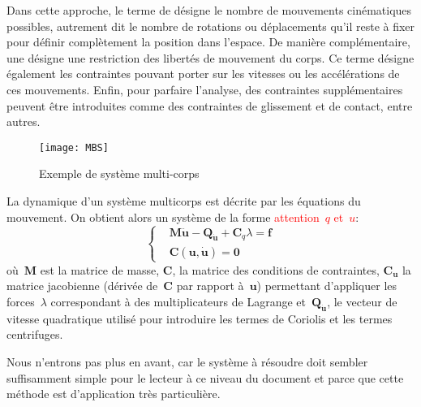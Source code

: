 \medskip
Dans cette approche, le terme de  désigne le nombre de mouvements cinématiques possibles, autrement dit le nombre de rotations ou déplacements qu'il reste à fixer pour définir complètement la position dans l'espace. De manière complémentaire, une  désigne une restriction des libertés de mouvement du corps. Ce terme désigne également les contraintes pouvant porter sur les vitesses ou les accélérations de ces mouvements. Enfin, pour parfaire l'analyse, des contraintes supplémentaires peuvent être introduites comme des contraintes de glissement et de contact, entre autres.
\begin{figure}[ht]
\centering
\texttt{[image: MBS]}
\caption{Exemple de système multi-corps}
\end{figure}
\medskipvm
La dynamique d'un système multicorps est décrite par les équations du mouvement. On obtient alors un système de la forme \textcolor{red}{attention~$q$ et~$u$}:
\begin{equation}%
\left\{%
\begin{aligned}%
&\mathbf{M}\ddot{\mathbf{u}}-\mathbf{Q}_{\dot{\mathbf{u}}}+\mathbf{C}_q\lambda = \mathbf{f}\\
&\mathbf{C}(\mathbf{u},\dot{\mathbf{u}})=\mathbf{0}
\end{aligned}\right.%
\end{equation}%
où~$\mathbf{M}$ est la matrice de masse, $\mathbf{C}$, la matrice des conditions de contraintes, $\mathbf{C}_\mathbf{u}$ la matrice jacobienne (dérivée de~$\mathbf{C}$ par rapport à~$\mathbf{u}$) permettant d'appliquer les forces~$\lambda$ correspondant à des multiplicateurs de Lagrange et~$\mathbf{Q}_{\dot{\mathbf{u}}}$, le vecteur de vitesse quadratique utilisé pour introduire les termes de Coriolis et les termes centrifuges.

\medskip
Nous n'entrons pas plus en avant, car le système à résoudre doit sembler suffisamment simple pour le lecteur à ce niveau du document et parce que cette méthode est d'application très particulière.
